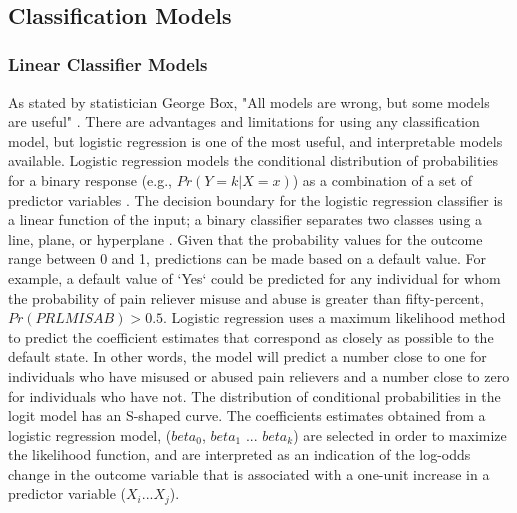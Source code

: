 \\\documentclass[sigconf]{acmart}
\begin{document}

\subsection{Classification Models}

\subsubsection{Linear Classifier Models}

As stated by statistician George Box, "All models are wrong, but some models 
are useful" \cite{box05}. There are advantages and limitations for using any 
classification model, but logistic regression is one of the most useful,
and interpretable models available. Logistic regression models the conditional 
distribution of probabilities for a binary response (e.g., $Pr(Y=k | X=x)$) 
as a combination of a set of predictor variables \cite{james13, raschka17}. 
The decision boundary for the logistic regression classifier is a linear 
function of the input; a binary classifier separates two classes using a line, 
plane, or hyperplane \cite{muller17}. Given that the probability values for 
the outcome range between 0 and 1, predictions can be made based on a default 
value. For example, a default value of `Yes` could be predicted for any 
individual for whom the probability of pain reliever misuse and abuse is 
greater than fifty-percent, $Pr(PRLMISAB) > 0.5$. Logistic regression uses 
a maximum likelihood method to predict the coefficient estimates that 
correspond as closely as possible to the default state. In other words, the 
model will predict a number close to one for individuals who have misused or 
abused pain relievers and a number close to zero for individuals who have 
not. The distribution of conditional probabilities in the logit model has an 
S-shaped curve. The coefficients estimates obtained from a logistic regression 
model, ($beta_0$, $beta_1$ ... $beta_k$) are selected in order to maximize the 
likelihood function, and are interpreted as an indication of the log-odds 
change in the outcome variable that is associated with a one-unit increase 
in a predictor variable ($X_i$...$X_j$). 

\end{document}
